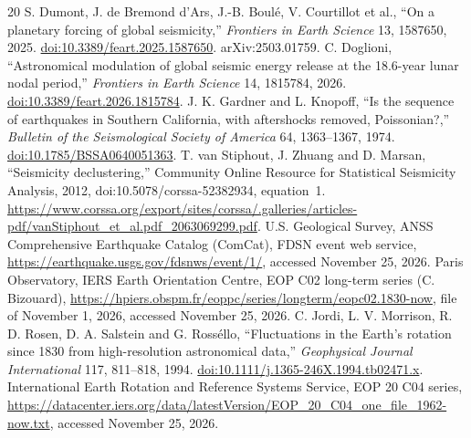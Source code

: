 \documentclass[11pt]{article}
\begin{document}
\begin{thebibliography}{20}
 S. Dumont, J. de Bremond d'Ars, J.-B. Boul\'e, V. Courtillot et al., ``On a planetary forcing of global seismicity,'' \emph{Frontiers in Earth Science} 13, 1587650, 2025. \href{https://doi.org/10.3389/feart.2025.1587650}{doi:10.3389/feart.2025.1587650}. arXiv:2503.01759.
 C. Doglioni, ``Astronomical modulation of global seismic energy release at the 18.6-year lunar nodal period,'' \emph{Frontiers in Earth Science} 14, 1815784, 2026. \href{https://doi.org/10.3389/feart.2026.1815784}{doi:10.3389/feart.2026.1815784}.
 J. K. Gardner and L. Knopoff, ``Is the sequence of earthquakes in Southern California, with aftershocks removed, Poissonian?,'' \emph{Bulletin of the Seismological Society of America} 64, 1363--1367, 1974. \href{https://doi.org/10.1785/BSSA0640051363}{doi:10.1785/BSSA0640051363}.
 T. van Stiphout, J. Zhuang and D. Marsan, ``Seismicity declustering,'' Community Online Resource for Statistical Seismicity Analysis, 2012, doi:10.5078/corssa-52382934, equation~1. \url{https://www.corssa.org/export/sites/corssa/.galleries/articles-pdf/vanStiphout_et_al.pdf_2063069299.pdf}.
 U.S. Geological Survey, ANSS Comprehensive Earthquake Catalog (ComCat), FDSN event web service, \url{https://earthquake.usgs.gov/fdsnws/event/1/}, accessed November 25, 2026.
 Paris Observatory, IERS Earth Orientation Centre, EOP C02 long-term series (C. Bizouard), \url{https://hpiers.obspm.fr/eoppc/series/longterm/eopc02.1830-now}, file of November 1, 2026, accessed November 25, 2026.
 C. Jordi, L. V. Morrison, R. D. Rosen, D. A. Salstein and G. Ross\'ello, ``Fluctuations in the Earth's rotation since 1830 from high-resolution astronomical data,'' \emph{Geophysical Journal International} 117, 811--818, 1994. \href{https://doi.org/10.1111/j.1365-246X.1994.tb02471.x}{doi:10.1111/j.1365-246X.1994.tb02471.x}.
 International Earth Rotation and Reference Systems Service, EOP 20 C04 series, \url{https://datacenter.iers.org/data/latestVersion/EOP_20_C04_one_file_1962-now.txt}, accessed November 25, 2026.
\end{thebibliography}
\end{document}
